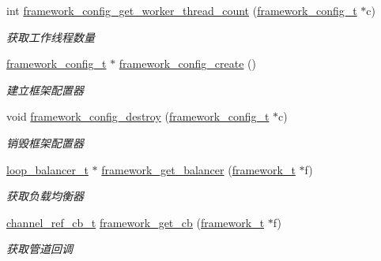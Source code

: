 \begin{DoxyCompactItemize}
int \hyperlink{a00048_aca3f6b57e6c3e601ddf2ecd8d536aa32_aca3f6b57e6c3e601ddf2ecd8d536aa32}{framework\+\_\+config\+\_\+get\+\_\+worker\+\_\+thread\+\_\+count} (\hyperlink{a00047_a55b26efa9e6ee05514d087ba2593a54b_a55b26efa9e6ee05514d087ba2593a54b}{framework\+\_\+config\+\_\+t} $\ast$c)
\begin{DoxyCompactList}\small\item\em 获取工作线程数量 \end{DoxyCompactList}\item 
\hyperlink{a00047_a55b26efa9e6ee05514d087ba2593a54b_a55b26efa9e6ee05514d087ba2593a54b}{framework\+\_\+config\+\_\+t} $\ast$ \hyperlink{a00048_a86930a2422f44672a2ddde80fb6a5b5a_a86930a2422f44672a2ddde80fb6a5b5a}{framework\+\_\+config\+\_\+create} ()
\begin{DoxyCompactList}\small\item\em 建立框架配置器 \end{DoxyCompactList}\item 
void \hyperlink{a00048_a4a798f64988a0fe651e2f247acae55b2_a4a798f64988a0fe651e2f247acae55b2}{framework\+\_\+config\+\_\+destroy} (\hyperlink{a00047_a55b26efa9e6ee05514d087ba2593a54b_a55b26efa9e6ee05514d087ba2593a54b}{framework\+\_\+config\+\_\+t} $\ast$c)
\begin{DoxyCompactList}\small\item\em 销毁框架配置器 \end{DoxyCompactList}\item 
\hyperlink{a00047_a649c7e850ab247b5f70ad27e335a129d_a649c7e850ab247b5f70ad27e335a129d}{loop\+\_\+balancer\+\_\+t} $\ast$ \hyperlink{a00048_a1cd41581680bc47f0d86d625fc3234ae_a1cd41581680bc47f0d86d625fc3234ae}{framework\+\_\+get\+\_\+balancer} (\hyperlink{a00047_a6149d769f6f07ed14a40a271c95d8463_a6149d769f6f07ed14a40a271c95d8463}{framework\+\_\+t} $\ast$f)
\begin{DoxyCompactList}\small\item\em 获取负载均衡器 \end{DoxyCompactList}\item 
\hyperlink{a00047_ae296ec4d1ce108960de8dcc423956a1d_ae296ec4d1ce108960de8dcc423956a1d}{channel\+\_\+ref\+\_\+cb\+\_\+t} \hyperlink{a00048_a4ff98245e1050ce4ddd0ced3bebe6b43_a4ff98245e1050ce4ddd0ced3bebe6b43}{framework\+\_\+get\+\_\+cb} (\hyperlink{a00047_a6149d769f6f07ed14a40a271c95d8463_a6149d769f6f07ed14a40a271c95d8463}{framework\+\_\+t} $\ast$f)
\begin{DoxyCompactList}\small\item\em 获取管道回调 \end{DoxyCompactList}\end{DoxyCompactItemize}


